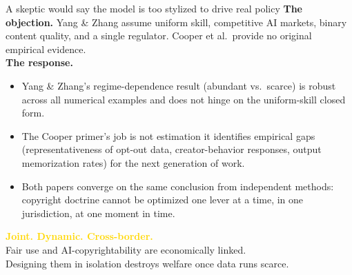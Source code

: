 \documentclass[aspectratio=169,11pt]{beamer}
\begin{document}
\begin{frame}{A skeptic would say the model is too stylized to drive real policy}
\vspace{0.2cm}
\textbf{The objection.} Yang \& Zhang assume uniform skill, competitive AI markets, binary content quality, and a single regulator. Cooper et al.\ provide no original empirical evidence.\\[0.4cm]
\textbf{The response.}
\begin{itemize}
\item Yang \& Zhang's \alert{regime-dependence result} (abundant vs.\ scarce) is robust across all numerical examples and does not hinge on the uniform-skill closed form.
\item The Cooper primer's job is not estimation \textemdash{} it identifies \alert{empirical gaps} (representativeness of opt-out data, creator-behavior responses, output memorization rates) for the next generation of work.
\item Both papers converge on the same conclusion from independent methods: \alert{copyright doctrine cannot be optimized one lever at a time, in one jurisdiction, at one moment in time.}
\end{itemize}
\end{frame}

{
\begin{frame}[plain]
\vfill
\begin{center}
{\huge\bfseries\textcolor{Gold}{Joint. Dynamic. Cross-border.}}\\[0.8cm]
{\Large\textcolor{SoftWhite}{Fair use and AI-copyrightability are economically linked.}}\\[0.3cm]
{\Large\textcolor{SoftWhite}{Designing them in isolation \alert{destroys} welfare once data runs scarce.}}
\end{center}
\vfill
\end{frame}}
\end{document}
